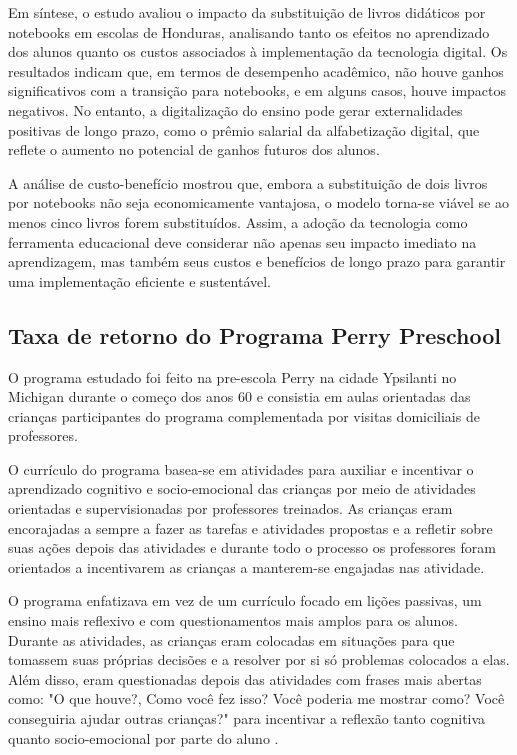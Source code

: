 \documentclass[12pt,letterpaper]{article}
\newcommand{\1}{\mathbbm{1}}
\numberwithin{equation}{section}
\begin{document}
Em síntese, o estudo avaliou o impacto da substituição de livros didáticos por notebooks em escolas de Honduras, analisando tanto os efeitos no aprendizado dos alunos quanto os custos associados à implementação da tecnologia digital. Os resultados indicam que, em termos de desempenho acadêmico, não houve ganhos significativos com a transição para notebooks, e em alguns casos, houve impactos negativos. No entanto, a digitalização do ensino pode gerar externalidades positivas de longo prazo, como o prêmio salarial da alfabetização digital, que reflete o aumento no potencial de ganhos futuros dos alunos.

A análise de custo-benefício mostrou que, embora a substituição de dois livros por notebooks não seja economicamente vantajosa, o modelo torna-se viável se ao menos cinco livros forem substituídos. Assim, a adoção da tecnologia como ferramenta educacional deve considerar não apenas seu impacto imediato na aprendizagem, mas também seus custos e benefícios de longo prazo para garantir uma implementação eficiente e sustentável.

\subsection{Taxa de retorno do Programa Perry Preschool}

O programa estudado foi feito na pre-escola Perry na cidade Ypsilanti no Michigan durante o começo dos anos 60 e consistia em aulas orientadas das crianças participantes do programa complementada por visitas domiciliais de professores.  

O currículo do programa basea-se em atividades para auxiliar e incentivar o aprendizado cognitivo e socio-emocional das crianças por meio de atividades orientadas e supervisionadas por professores treinados. As crianças eram encorajadas a sempre a fazer as tarefas e atividades propostas e a refletir sobre suas ações depois das atividades e durante todo o processo os professores foram orientados a incentivarem as crianças a manterem-se engajadas nas atividade. 

O programa enfatizava em vez de um currículo focado em lições passivas, um ensino mais reflexivo e com questionamentos mais amplos para os alunos. Durante as atividades, as crianças eram colocadas em situações para que tomassem suas próprias decisões e a resolver por si só problemas colocados a elas. Além disso, eram questionadas depois das atividades com frases mais abertas como: "O que houve?, Como você fez isso? Você poderia me mostrar como? Você conseguiria ajudar outras crianças?" para incentivar a reflexão tanto cognitiva quanto socio-emocional por parte do aluno \cite{heckman2010rate}. 
\end{document}
